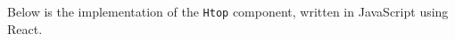 \documentclass[12pt]{article}
\begin{document}
Below is the implementation of the \texttt{Htop} component, written in JavaScript using React. 


  








        
\end{document}
